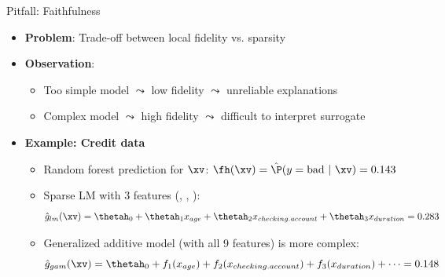 \documentclass[11pt,compress,t,notes=noshow, aspectratio=169, xcolor=table]{beamer}
\newcommand{\gh}{\hat{g}}
\begin{document}
\begin{frame}{Pitfall: Faithfulness}
\begin{itemize}
	\item \textbf{Problem}: Trade-off between local fidelity vs. sparsity
	\item \textbf{Observation}:
    \begin{itemize}
        \item Too simple model $\leadsto$ low fidelity $\leadsto$ unreliable explanations
        \item Complex model $\leadsto$ high fidelity $\leadsto$ difficult to interpret surrogate %
    \end{itemize}
	\pause
	\item \textbf{Example: Credit data} 
	\begin{itemize}
	\itemsep0em
	    \item Random forest prediction for $\xv$: 
	    $\fh(\xv) = \hat{\P}(y = \text{bad} ~|~ \xv) = 0.143$
	    \item %
	    Sparse LM with 3 features (, , ):
	    $$\gh_{lm}(\xv) = \thetah_0 + \thetah_1 x_{age} + \thetah_2 x_{checking.account} + \thetah_3 x_{duration} = 0.283$$
	    \item Generalized additive model (with all 9 features) is more complex:
    $$%
    \gh_{gam}(\xv) = \thetah_0 + f_{1}(x_{age}) + f_{2}(x_{checking.account}) + f_{3}(x_{duration}) +  \dots %
    = 0.148$$
	\end{itemize}
\end{itemize}

\end{frame}
\end{document}
